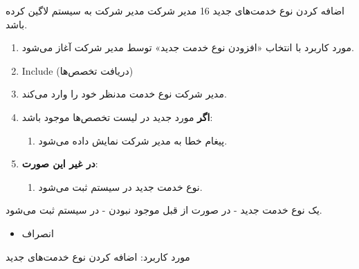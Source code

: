 {
\usecase
{اضافه کردن نوع خدمت‌های جدید}
{16}
{}
{مدیر شرکت}
{}
{مدیر شرکت به سیستم لاگین کرده باشد.}
{
	\vspace*{-0.6cm}
	\begin{enumerate}
		\item 
		مورد کاربرد با انتخاب «افزودن نوع خدمت جدید» توسط مدیر شرکت آغاز می‌شود.
		\item Include (دریافت تخصص‌ها)
		\item مدیر شرکت نوع خدمت مدنظر خود را وارد می‌کند. 
		\item
		\textbf{اگر}
		مورد جدید در لیست تخصص‌ها موجود باشد:
		\begin{enumerate}[label=\theenumi.\arabic*.]
			\item پیغام خطا به مدیر شرکت نمایش داده می‌شود.
		\end{enumerate}
		\item
		\textbf{در غیر این صورت}:
		\begin{enumerate}[label=\theenumi.\arabic*.]
			\item نوع خدمت جدید در سیستم ثبت می‌شود.
		\end{enumerate}		
	\end{enumerate}
}
{یک نوع خدمت جدید - در صورت از قبل موجود نبودن - در سیستم ثبت می‌شود.}
{
	\begin{itemize}
		\vspace*{-0.6cm}
		\item انصراف
	\end{itemize}
}
{
	مورد کاربرد: اضافه کردن نوع خدمت‌های جدید 
}

}


